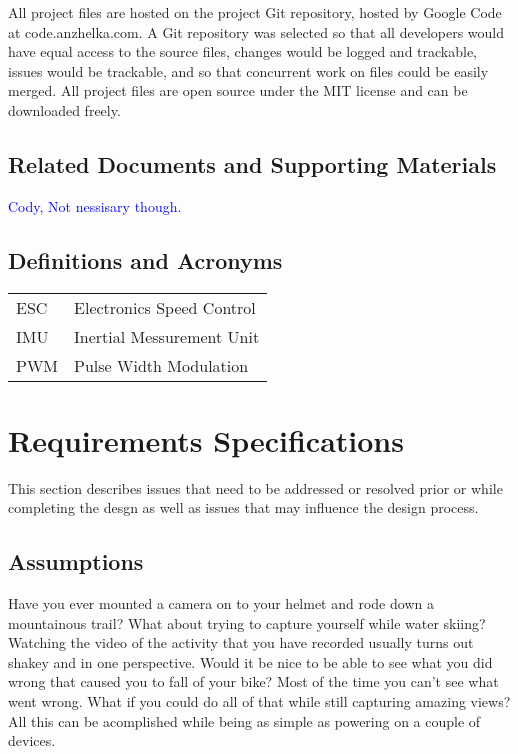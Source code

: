 \documentclass{article}
\numberwithin{equation}{section} %
\begin{document}

All project files are hosted on the project Git repository, hosted by Google Code at code.anzhelka.com. A Git repository was selected so that all developers would have equal access to the source files, changes would be logged and trackable, issues would be trackable, and so that concurrent work on files  could be easily merged. All project files are open source under the MIT license and can be downloaded freely.





\subsection{Related Documents and Supporting Materials}

\textcolor{blue}{Cody, Not nessisary though.} 


\subsection{Definitions and Acronyms}
\begin{tabular}{l l}
	ESC & Electronics Speed Control \\
	IMU & Inertial Messurement Unit \\
	PWM & Pulse Width Modulation \\
\end{tabular}



\section{Requirements Specifications}
This section describes issues that need to be addressed or resolved prior or while completing the desgn as well as issues that may influence the design process.


\subsection{Assumptions}
Have you ever mounted a camera on to your helmet and rode down a mountainous trail? What about trying to capture yourself while water skiing? Watching the video of the activity that you have recorded usually turns out shakey and in one perspective. Would it be nice to be able to see what you did wrong that caused you to fall of your bike? Most of the time you can't see what went wrong. What if you could do all of that while still capturing amazing views?  All this can be acomplished while being as simple as powering on a couple of devices. 
\end{document}

